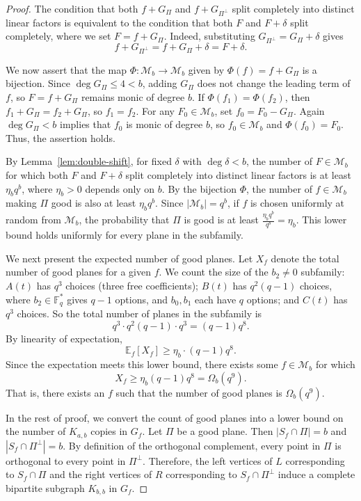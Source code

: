 \documentclass[11pt,a4paper]{article}
\theoremstyle{definition}
\theoremstyle{remark}
\begin{document}
\begin{proof}
The condition that both $f + G_\Pi$ and $f + G_{\Pi^\perp}$ split completely into distinct linear factors is equivalent to the condition that both $F$ and $F+\delta$ split completely, where we set $F = f + G_\Pi$. Indeed, substituting $G_{\Pi^\perp} = G_\Pi + \delta$ gives
\[
f + G_{\Pi^\perp} = f + G_\Pi + \delta = F + \delta.
\]

We now assert that the map $\Phi: \mathcal{M}_b \to \mathcal{M}_b$ given by $\Phi(f) = f + G_\Pi$ is a bijection.
Since $\deg G_\Pi \leq 4 < b$, adding $G_\Pi$ does not change the leading term of $f$, so $F = f+G_\Pi$ remains monic of degree $b$.
If $\Phi(f_1) = \Phi(f_2)$, then $f_1 + G_\Pi = f_2 + G_\Pi$, so $f_1 = f_2$.
For any $F_0 \in \mathcal{M}_b$, set $f_0 = F_0 - G_\Pi$. 
Again $\deg G_\Pi < b$ implies that $f_0$ is monic of degree $b$, so $f_0 \in \mathcal{M}_b$ and $\Phi(f_0) = F_0$. 
Thus, the assertion holds.

By Lemma~\ref{lem:double-shift}, for fixed $\delta$ with $\deg \delta < b$, the number of $F \in \mathcal{M}_b$ for which both $F$ and $F+\delta$ split completely into distinct linear factors is at least $\eta_b q^b$, where $\eta_b > 0$ depends only on $b$. By the bijection $\Phi$, the number of $f \in \mathcal{M}_b$ making $\Pi$ good is also at least $\eta_b q^b$.
Since $|\mathcal{M}_b| = q^b$, if $f$ is chosen uniformly at random from $\mathcal{M}_b$, the probability that $\Pi$ is good is at least
$\frac{\eta_b q^b}{q^b} = \eta_b.$
This lower bound holds uniformly for every plane in the subfamily.

We next present the expected number of good planes.
Let $X_f$ denote the total number of good planes for a given $f$. 
We count the size of the $b_2 \neq 0$ subfamily:
$A(t)$ has $q^3$ choices (three free coefficients);
$B(t)$ has $q^2(q-1)$ choices, where $b_2 \in \mathbb{F}_q^*$ gives $q-1$ options,
and $b_0,b_1$ each have $q$ options;
and $C(t)$ has $q^3$ choices.
So the total number of planes in the subfamily is
\[
q^3 \cdot q^2(q-1) \cdot q^3 = (q-1) q^8.
\]
By linearity of expectation,
\[
\mathbb{E}_f [X_f] \geq \eta_b \cdot (q-1) q^8.
\]
Since the expectation meets this lower bound, there exists some $f \in \mathcal{M}_b$ for which
\[
X_f \geq \eta_b (q-1) q^8 = \Omega_b(q^9).
\]
That is, there exists an $f$ such that the number of good planes is $\Omega_b(q^9)$.



In the rest of proof, we  convert the count of good planes into a lower bound on the number of $K_{a,b}$ copies in $G_f$.
Let $\Pi$ be a good plane. Then $|S_f \cap \Pi| = b$ and $|S_f \cap \Pi^\perp| = b$. By definition of the orthogonal complement, every point in $\Pi$ is orthogonal to every point in $\Pi^\perp$. Therefore, the left vertices of $L$ corresponding to $S_f \cap \Pi$ and the right vertices of $R$ corresponding to $S_f \cap \Pi^\perp$ induce a complete bipartite subgraph $K_{b,b}$ in $G_f$.


\end{proof}
\end{document}
